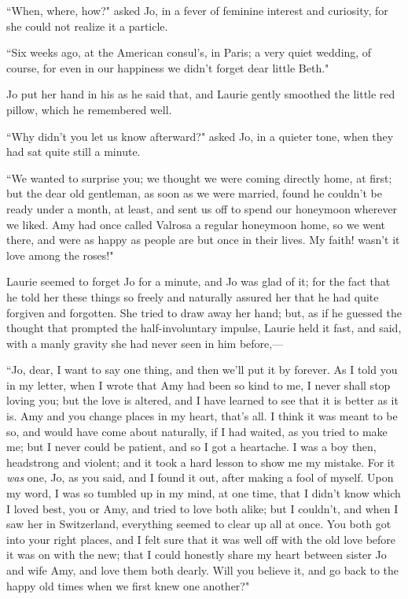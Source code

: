 ``When, where, how?" asked Jo, in a fever of feminine interest and
curiosity, for she could not realize it a particle.

``Six weeks ago, at the American consul's, in Paris; a
very quiet wedding, of course, for even in our happiness we
didn't forget dear little Beth."

Jo put her hand in his as he said that, and Laurie gently smoothed the
little red pillow, which he remembered well.

``Why didn't you let us know afterward?" asked Jo, in a
quieter tone, when they had sat quite still a minute.

``We wanted to surprise you; we thought we were coming directly home, at
first; but the dear old gentleman, as soon as we were married, found he
couldn't be ready under a month, at least, and sent us
off to spend our honeymoon wherever we liked. Amy had once called
Valrosa a regular honeymoon home, so we went there, and were as happy as
people are but once in their lives. My faith! wasn't it
love among the roses!"

Laurie seemed to forget Jo for a minute, and Jo was glad of it; for the
fact that he told her these things so freely and naturally assured her
that he had quite forgiven and forgotten. She tried to draw away her
hand; but, as if he guessed the thought that prompted the
half-involuntary impulse, Laurie held it fast, and said, with a manly
gravity she had never seen in him before,---

``Jo, dear, I want to say one thing, and then we'll put
it by forever. As I told you in my letter, when I wrote that Amy had
been so kind to me, I never shall stop loving you; but the love is
altered, and I have learned to see that it is better as it is. Amy and
you change places in my heart, that's all. I think it
was meant to be so, and would have come about naturally, if I had
waited, as you tried to make me; but I never could be patient, and so I
got a heartache. I was a boy then, headstrong and violent; and it took a
hard lesson to show me my mistake. For it \emph{was} one, Jo, as you
said, and I found it out, after making a fool of myself. Upon my word, I
was so tumbled up in my mind, at one time, that I didn't
know which I loved best, you or Amy, and tried to love both alike; but I
couldn't, and when I saw her in Switzerland, everything
seemed to clear up all at once. You both got into your right places, and
I felt sure that it was well off with the old love before it was on with
the new; that I could honestly share my heart between sister Jo and wife
Amy, and love them both dearly. Will you believe it, and go back to the
happy old times when we first knew one another?"

